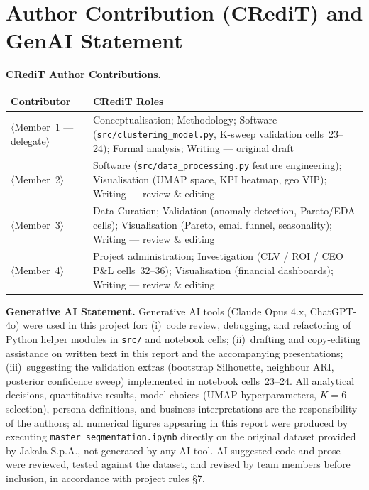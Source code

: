 \documentclass[10pt,a4paper]{article}
\begin{document}
\section{Author Contribution (CRediT) and GenAI Statement}
\label{app:credit}

\textbf{CRediT Author Contributions.}

\vspace{4pt}
\noindent
\begin{tabular}{@{}p{4.2cm}p{9.0cm}@{}}
\toprule
\textbf{Contributor} & \textbf{CRediT Roles} \\
\midrule
$\langle$Member~1 --- delegate$\rangle$ &
  Conceptualisation; Methodology; Software (\texttt{src/clustering\_model.py},
  K-sweep validation cells~23--24); Formal analysis;
  Writing --- original draft \\[3pt]
$\langle$Member~2$\rangle$ &
  Software (\texttt{src/data\_processing.py} feature engineering);
  Visualisation (UMAP space, KPI heatmap, geo VIP);
  Writing --- review \& editing \\[3pt]
$\langle$Member~3$\rangle$ &
  Data Curation; Validation (anomaly detection, Pareto/EDA cells);
  Visualisation (Pareto, email funnel, seasonality);
  Writing --- review \& editing \\[3pt]
$\langle$Member~4$\rangle$ &
  Project administration; Investigation (CLV / ROI / CEO P\&L cells~32--36);
  Visualisation (financial dashboards);
  Writing --- review \& editing \\
\bottomrule
\end{tabular}

\vspace{8pt}
\textbf{Generative AI Statement.}
Generative AI tools (Claude Opus 4.x, ChatGPT-4o) were used in this project for:
(i)~code review, debugging, and refactoring of Python helper modules in
\texttt{src/} and notebook cells; (ii)~drafting and copy-editing assistance on
written text in this report and the accompanying presentations; (iii)~suggesting
the validation extras (bootstrap Silhouette, neighbour ARI, posterior confidence
sweep) implemented in notebook cells~23--24. All analytical decisions, quantitative
results, model choices (UMAP hyperparameters, $K{=}6$ selection), persona
definitions, and business interpretations are the responsibility of the authors;
all numerical figures appearing in this report were produced by executing
\texttt{master\_segmentation.ipynb} directly on the original dataset provided by
Jakala S.p.A., not generated by any AI tool. AI-suggested code and prose were
reviewed, tested against the dataset, and revised by team members before inclusion,
in accordance with project rules \S7.
\end{document}
